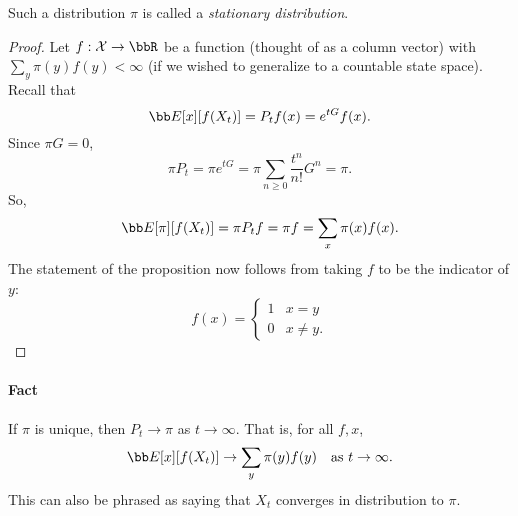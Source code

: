 \documentclass[../../../Master/AppliedStochastics.tex]{subfiles}
\begin{document}
Such a distribution $\pi$ is called a \emph{stationary distribution}.


\begin{proof}
Let $f:\mathcal{X}\to \bbR$ be a function (thought of as a column vector) with 
$\sum_y \pi(y)f(y) < \infty$ (if we wished to generalize to a countable state 
space). Recall that
\[
	\bb E[x] [f(X_t)] = P_t f(x) = e^{tG} f(x).
\]
Since $\pi G = 0$, 
\[
	\pi P_t = \pi e^{tG} = \pi \sum_{n\geq 0} \frac{t^n}{n!} G^n = \pi.
\]
So,
\[
	\bb E[\pi] [f(X_t)] = \pi P_t f = \pi f = \sum_{x} \pi(x) f(x).
\]
The statement of the proposition now follows from taking $f$ to be the 
indicator of $y$:
\[
	f(x) = \begin{cases}
		1 & x=y\\
		0 & x\neq y.
	\end{cases}
\]
\end{proof}


\paragraph{Fact}
If $\pi$ is unique, then $P_t \to \pi$ as $t\to \infty$. That is, for all $f, 
x$, 
	\[
		\bb E[x] [f(X_t)]\to \sum_y \pi(y) f(y) \quad \text{as }t\to \infty.
	\]
	This can also be phrased as saying that $X_t$ converges in distribution to 
	$\pi$. 


%
\end{document}
